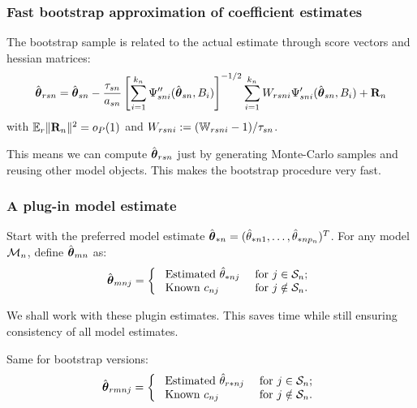 \documentclass[handout,10pt]{beamer}
\begin{document}

\begin{frame}
\frametitle{Fast bootstrap approximation of coefficient estimates}

The bootstrap sample is related to the actual estimate through score vectors and hessian matrices:
%
$$
\hat {{\boldsymbol{\theta}}}_{r s n} = \hat {{\boldsymbol{\theta}}}_{s n} - 
 \frac{\tau_{s n}}{a_{s n}} 
 \left[ \sum_{i=1}^{k_n} \Psi''_{s n i} (\hat {{\boldsymbol{\theta}}}_{s n}, B_i) \right]^{-1/2}
\sum_{i=1}^{k_n} W_{r s n i} \Psi'_{s n i} (\hat {{\boldsymbol{\theta}}}_{s n}, B_i) + {\mathbf{R}}_n
$$
%
with ${\mathbb{E}}_r \| {\mathbf{R}}_n \|^2 = o_P(1)$ and $W_{r s n i} := ({\mathbb{W}}_{r s n i} - 1)/ \tau_{s n}$.

\vspace{1em}
This means we can compute $\hat {{\boldsymbol{\theta}}}_{r s n}$ just by generating Monte-Carlo samples and reusing other model objects. This makes the bootstrap procedure very fast.
\end{frame}


\begin{frame}
\frametitle{A plug-in model estimate}
Start with the preferred model estimate $\hat {{\boldsymbol{\theta}}}_{* n} = (\hat \theta_{* n 1}, \ldots, \hat \theta_{* n p_n})^T$. For any model ${\cal{M}}_n$, define $\hat {{\boldsymbol{\theta}}}_{m n}$ as:
%
$$
 \hat{{\boldsymbol{\theta}}}_{m n j} = \left\{ \begin{array}{ll}
 \text{ Estimated} \ \hat{\theta}_{*n j} & \text{ for } 
 			j \in {\cal{S}}_{n}; \\
 \text{ Known} \  c_{nj} & \text{ for } j \notin {\cal{S}}_{n}.
\end{array}
\right.
$$
%

We shall work with these plugin estimates. This saves time while still ensuring consistency of all model estimates.

\vspace{1em}
Same for bootstrap versions:
%
$$
 \hat{{\boldsymbol{\theta}}}_{r m n j} = \left\{ \begin{array}{ll}
 \text{ Estimated} \ \hat{\theta}_{r *n j} & \text{ for } 
 			j \in {\cal{S}}_{n}; \\
 \text{ Known} \  c_{nj} & \text{ for } j \notin {\cal{S}}_{n}.
\end{array}
\right.
$$
%
\end{frame}

\end{document}
